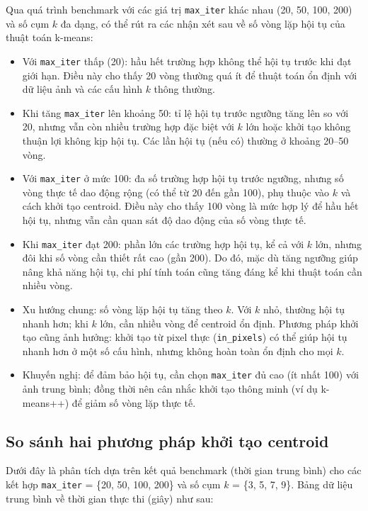 Qua quá trình benchmark với các giá trị \texttt{max\_iter} khác nhau (20, 50, 100, 200) và số cụm \(k\) đa dạng, có thể rút ra các nhận xét sau về số vòng lặp hội tụ của thuật toán k-means:

\begin{itemize}
  \item Với \texttt{max\_iter} thấp (20): hầu hết trường hợp không thể hội tụ trước khi đạt giới hạn. Điều này cho thấy 20 vòng thường quá ít để thuật toán ổn định với dữ liệu ảnh và các cấu hình \(k\) thông thường.
  \item Khi tăng \texttt{max\_iter} lên khoảng 50: tỉ lệ hội tụ trước ngưỡng tăng lên so với 20, nhưng vẫn còn nhiều trường hợp đặc biệt với \(k\) lớn hoặc khởi tạo không thuận lợi không kịp hội tụ. Các lần hội tụ (nếu có) thường ở khoảng 20–50 vòng.
  \item Với \texttt{max\_iter} ở mức 100: đa số trường hợp hội tụ trước ngưỡng, nhưng số vòng thực tế dao động rộng (có thể từ 20 đến gần 100), phụ thuộc vào \(k\) và cách khởi tạo centroid. Điều này cho thấy 100 vòng là mức hợp lý để hầu hết hội tụ, nhưng vẫn cần quan sát độ dao động của số vòng thực tế.
  \item Khi \texttt{max\_iter} đạt 200: phần lớn các trường hợp hội tụ, kể cả với \(k\) lớn, nhưng đôi khi số vòng cần thiết rất cao (gần 200). Do đó, mặc dù tăng ngưỡng giúp nâng khả năng hội tụ, chi phí tính toán cũng tăng đáng kể khi thuật toán cần nhiều vòng.
  \item Xu hướng chung: số vòng lặp hội tụ tăng theo \(k\). Với \(k\) nhỏ, thường hội tụ nhanh hơn; khi \(k\) lớn, cần nhiều vòng để centroid ổn định. Phương pháp khởi tạo cũng ảnh hưởng: khởi tạo từ pixel thực (\texttt{in\_pixels}) có thể giúp hội tụ nhanh hơn ở một số cấu hình, nhưng không hoàn toàn ổn định cho mọi \(k\).
  \item Khuyến nghị: để đảm bảo hội tụ, cần chọn \texttt{max\_iter} đủ cao (ít nhất 100) với ảnh trung bình; đồng thời nên cân nhắc khởi tạo thông minh (ví dụ k-means++) để giảm số vòng lặp thực tế.
\end{itemize}


\subsection{So sánh hai phương pháp khởi tạo centroid}

Dưới đây là phân tích dựa trên kết quả benchmark (thời gian trung bình) cho các kết hợp \texttt{max\_iter} = \{20, 50, 100, 200\} và số cụm \(k\) = \{3, 5, 7, 9\}. Bảng dữ liệu trung bình về thời gian thực thi (giây) như sau:

